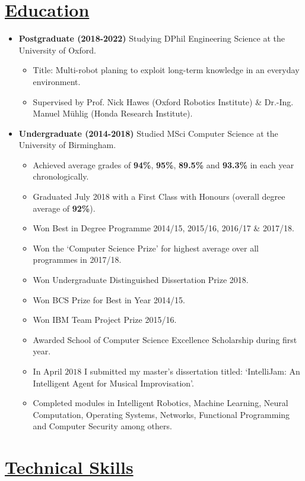 \documentclass[11pt]{article}
\begin{document}
	\vspace{-30pt}
	\hspace{-100pt}\section*{\underline{Education}}
		\begin {itemize}
			\item \textbf{Postgraduate (2018-2022)} Studying DPhil Engineering Science at the University of Oxford.
				\begin{itemize}
					\item Title: Multi-robot planing to exploit long-term knowledge in an everyday environment.
					\item Supervised by Prof. Nick Hawes (Oxford Robotics Institute) \& Dr.-Ing. Manuel M{\"u}hlig (Honda Research Institute).
				\end{itemize}
		
			\item \textbf{Undergraduate (2014-2018)} Studied MSci Computer Science at the University of Birmingham.
				\begin{itemize}
					\item Achieved average grades of \textbf{94\%}, \textbf{95\%}, \textbf{89.5\%} and \textbf{93.3\%} in each year chronologically.
					\item Graduated July 2018 with a First Class with Honours (overall degree average of \textbf{92\%}).
					\item Won Best in Degree Programme 2014/15, 2015/16, 2016/17 \& 2017/18.
					\item Won the `Computer Science Prize' for highest average over all programmes in 2017/18.
					\item Won Undergraduate Distinguished Dissertation Prize 2018.
					\item Won BCS Prize for Best in Year 2014/15.
					\item Won IBM Team Project Prize 2015/16.
					\item Awarded School of Computer Science Excellence Scholarship during first year.
					\item In April $2018$ I submitted my master's dissertation titled: `IntelliJam: An Intelligent Agent for Musical Improvisation'.
					\item Completed modules in Intelligent Robotics, Machine Learning, Neural Computation, Operating Systems, Networks, Functional Programming and Computer Security among others.
				\end{itemize}
			
		\end{itemize}
	\vspace{-20pt}
	\hspace{-100pt}\section*{\underline{Technical Skills}}
\end{document}
